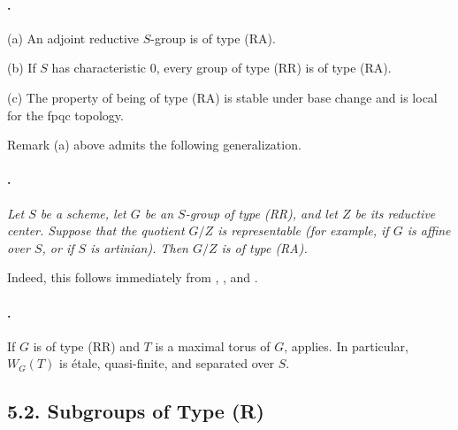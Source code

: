 \paragraph{.}
\textup{(a)} An adjoint reductive \(S\)-group is of type
\textup{(RA)}.

\textup{(b)} If \(S\) has characteristic \(0\), every group of
type \textup{(RR)} is of type \textup{(RA)}.

\textup{(c)} The property of being of type \textup{(RA)} is stable
under base change and is local for the fpqc topology.

Remark \textup{(a)} above admits the following generalization.

\paragraph{.}
\textit{Let \(S\) be a scheme, let \(G\) be an \(S\)-group of type
\textup{(RR)}, and let \(Z\) be its reductive center. Suppose that
the quotient \(G/Z\) is representable \textup{(for example, if
\(G\) is affine over \(S\), or if \(S\) is artinian)}. Then \(G/Z\)
is of type \textup{(RA)}.}

Indeed, this follows immediately from , , and 
\textup{}.

\paragraph{.}
If \(G\) is of type \textup{(RR)} and \(T\) is a maximal torus of
\(G\),  applies. In particular,
\(W_G(T)\) is étale, quasi-finite, and separated over \(S\).

\subsection*{5.2. Subgroups of Type \textup{(R)}}

